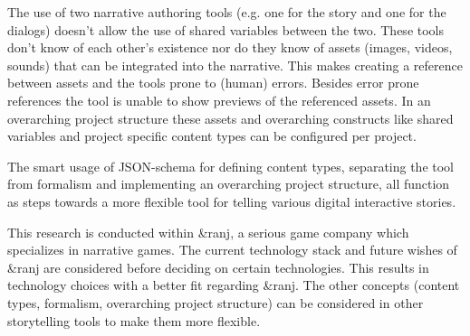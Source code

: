 The use of two narrative authoring tools (e.g. one for the story and one for the dialogs) doesn’t allow the use of shared variables between the two. These tools don’t know of each other’s existence nor do they know of assets (images, videos, sounds) that can be integrated into the narrative. This makes creating a reference between assets and the tools prone to (human) errors. Besides error prone references the tool is unable to show previews of the referenced assets. In an overarching project structure these assets and overarching constructs like shared variables and project specific content types can be configured per project.

The smart usage of JSON-schema for defining content types, separating the tool from formalism and implementing an overarching project structure, all function as steps towards a more flexible tool for telling various digital interactive stories.

This research is conducted within \&ranj, a serious game company which specializes in narrative games. The current technology stack and future wishes of \&ranj are considered before deciding on certain technologies. This results in technology choices with a better fit regarding \&ranj. The other concepts (content types, formalism, overarching project structure) can be considered in other storytelling tools to make them more flexible. 